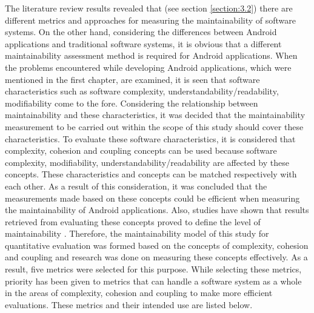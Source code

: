 The literature review results revealed that (see section \ref{section:3.2}) there are different metrics and approaches for measuring the maintainability of software systems. On the other hand, considering the differences between Android applications and traditional software systems, it is obvious that a different maintainability assessment method is required for Android applications. When the problems encountered while developing Android applications, which were mentioned in the first chapter, are examined, it is seen that software characteristics such as software complexity, understandability/readability, modifiability come to the fore. Considering the relationship between maintainability and these characteristics, it was decided that the maintainability measurement to be carried out within the scope of this study should cover these characteristics. To evaluate these software characteristics, it is considered that complexity, cohesion and coupling concepts can be used because software complexity, modifiability, understandability/readability are affected by these concepts. These characteristics and concepts can be matched respectively with each other. As a result of this consideration, it was concluded that the measurements made based on these concepts could be efficient when measuring the maintainability of Android applications. Also, studies have shown that results retrieved from evaluating these concepts proved to define the level of maintainability \cite{33}. Therefore, the maintainability model of this study for quantitative evaluation was formed based on the concepts of complexity, cohesion and coupling and research was done on measuring these concepts effectively. As a result, five metrics were selected for this purpose. While selecting these metrics, priority has been given to metrics that can handle a software system as a whole in the areas of complexity, cohesion and coupling to make more efficient evaluations. These metrics and their intended use are listed below.
